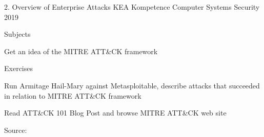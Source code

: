 \documentclass[Screen16to9,17pt]{foils}
\begin{document}
\mytitlepage
{2. Overview of Enterprise Attacks}
{KEA Kompetence Computer Systems Security 2019}



\begin{list1}
\item Subjects
\begin{list2}
\item Get an idea of the MITRE ATT\&CK framework
\item
\item
\end{list2}
\item Exercises
\begin{list2}
\item Run Armitage Hail-Mary against Metasploitable, describe attacks that succeeded in relation to MITRE ATT\&CK framework
\item
\end{list2}
\end{list1}




\begin{list1}
\item
Read ATT\&CK 101 Blog Post and browse MITRE ATT\&CK web site 
\end{list1}


\CVE






Source:







\slidenext
\end{document}
